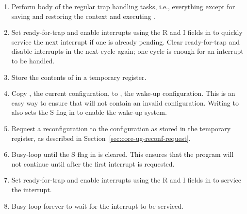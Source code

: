 \begin{enumerate}

\item Perform body of the regular trap handling tasks, i.e., everything except 
for saving and restoring the context and executing .

\item Set ready-for-trap and enable interrupts using the R and I fields in 
 to quickly service the next interrupt if one is already pending.
Clear ready-for-trap and disable interrupts in the next cycle again; one cycle
is enough for an interrupt to be handled.

\item Store the contents of  in a temporary register.

\item Copy , the current configuration, to , the wake-up
configuration. This is an easy way to ensure that  will not contain
an invalid configuration. Writing to  also sets the S flag in
 to enable the wake-up system.

\item Request a reconfiguration to the configuration as stored in the temporary
register, as described in Section~\ref{sec:core-ug-reconf-request}.

\item Busy-loop until the S flag in  is cleared. This ensures that
the program will not continue until after the first interrupt is requested.

\item Set ready-for-trap and enable interrupts using the R and I fields in 
 to service the interrupt.

\item Busy-loop forever to wait for the interrupt to be serviced.

\end{enumerate}






